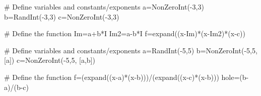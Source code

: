 \begin{sagesilent}
# Define variables and constants/exponents
a=NonZeroInt(-3,3)
b=RandInt(-3,3)
c=NonZeroInt(-3,3)

# Define the function
Im=a+b*I
Im2=a-b*I
f=expand((x-Im)*(x-Im2)*(x-c))

\end{sagesilent}
 


\begin{sagesilent}
# Define variables and constants/exponents
a=RandInt(-5,5)
b=NonZeroInt(-5,5, [a])
c=NonZeroInt(-5,5, [a,b])

# Define the function
f=(expand((x-a)*(x-b)))/(expand((x-c)*(x-b)))
hole=(b-a)/(b-c)

\end{sagesilent}
 
